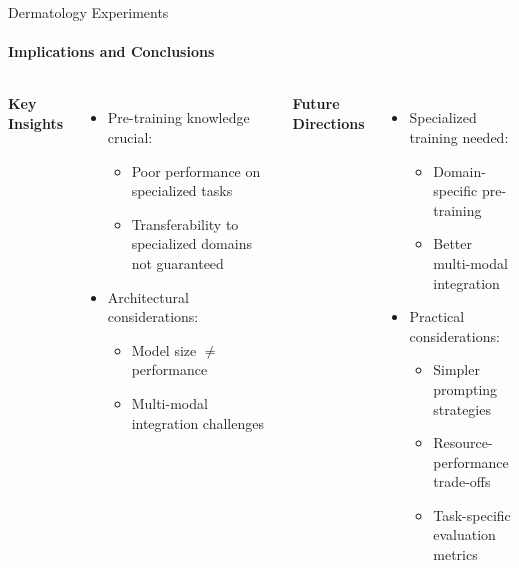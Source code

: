\documentclass[aspectratio=169]{beamer}
\begin{document}
\begin{frame}{Dermatology Experiments}
\framesubtitle{Implications and Conclusions}
  \begin{columns}[T]
      \textbf{Key Insights}
      \begin{itemize}
        \item Pre-training knowledge crucial:
          \begin{itemize}
            \item Poor performance on specialized tasks
            \item Transferability to specialized domains not guaranteed
          \end{itemize}
        \item Architectural considerations:
          \begin{itemize}
            \item Model size \(\neq\) performance
            \item Multi-modal integration challenges
          \end{itemize}
      \end{itemize}
      \textbf{Future Directions}
      \begin{itemize}
        \item Specialized training needed:
          \begin{itemize}
            \item Domain-specific pre-training
            \item Better multi-modal integration
          \end{itemize}
        \item Practical considerations:
          \begin{itemize}
            \item Simpler prompting strategies
            \item Resource-performance trade-offs
            \item Task-specific evaluation metrics
          \end{itemize}
      \end{itemize}
  \end{columns}
\end{frame}
\end{document}
